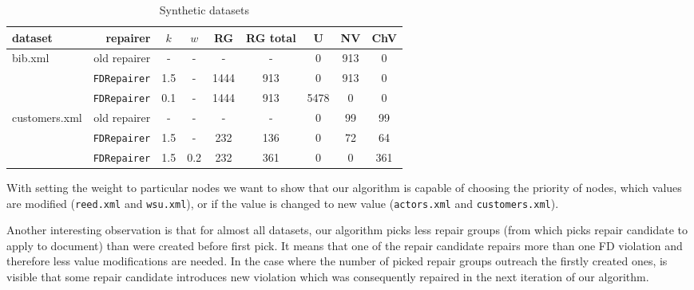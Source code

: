 \begin{table}
    \begin{tabular}{| l | r | *{7}{c|}}
    \hline
    dataset & repairer & $k$ & $w$ & RG & RG total & U & NV & ChV\\ \hline
    \multirow{3}{*}{bib.xml} & old repairer & - & - & - & - & 0 & 913 & 0\\
    & \texttt{FDRepairer} & 1.5 & - & 1444 & 913 & 0 & 913 & 0\\
    & \texttt{FDRepairer} & 0.1 & - & 1444 & 913 & 5478 & 0 & 0\\ \hline
    \multirow{3}{*}{customers.xml} & old repairer & - & - & - & - & 0 & 99 & 99\\
    & \texttt{FDRepairer} & 1.5 & - & 232 & 136 & 0 & 72 & 64\\
    & \texttt{FDRepairer} & 1.5 & 0.2 & 232 & 361 & 0 & 0 & 361\\\hline
    \end{tabular}
\caption{Synthetic datasets}
\label{syntheticTable}
\end{table}

With setting the weight to particular nodes we want to show that our algorithm is capable of choosing the priority of nodes, which values are modified (\texttt{reed.xml} and \texttt{wsu.xml}), or if the value is changed to new value (\texttt{actors.xml} and \texttt{customers.xml}).

Another interesting observation is that for almost all datasets, our algorithm picks less repair groups (from which picks repair candidate to apply to document) than were created before first pick. It means that one of the repair candidate repairs more than one FD violation and therefore less value modifications are needed. In the case where the number of picked repair groups outreach the firstly created ones, is visible that some repair candidate introduces new violation which was consequently repaired in the next iteration of our algorithm.
